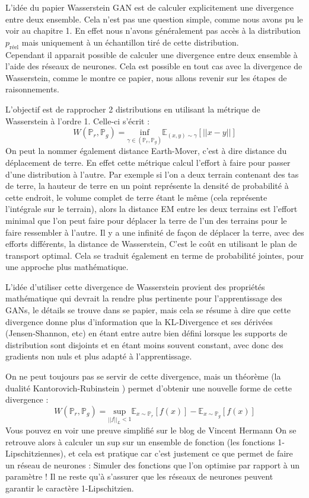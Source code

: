 L'idée du papier Wasserstein GAN est de calculer explicitement une divergence entre deux ensemble. Cela n'est pas une question simple, comme nous avons pu le voir au chapitre 1. En effet nous n'avons généralement pas accès à la distribution $p_{\text{réel}}$ mais uniquement à un échantillon tiré de cette distribution. \\ Cependant il apparait possible de calculer une divergence entre deux ensemble à l'aide des réseaux de neurones. Cela est possible en tout cas avec la divergence de Wasserstein, comme le montre ce papier, nous allons revenir sur les étapes de raisonnements.

L'objectif est de rapprocher 2 distributions en utilisant la métrique de Wasserstein à l'ordre 1. Celle-ci s'écrit :
\[
W(\mathbb{P}_r, \mathbb{P}_g)= \underset{\gamma \in (\mathbb{P}_r, \mathbb{P}_g)}{\text{inf}} \mathbb{E}_{(x,y)\sim\gamma} \left[ ||x-y||\right]
\]
On peut la nommer également distance Earth-Mover, c'est à dire distance du déplacement de terre. En effet cette métrique calcul l'effort à faire pour passer d'une distribution à l'autre. Par exemple si l'on a deux terrain contenant des tas de terre, la hauteur de terre en un point représente la densité de probabilité à cette endroit, le volume complet de terre étant le même (cela représente l'intégrale sur le terrain), alors la distance EM entre les deux terrains est l'effort minimal que l'on peut faire pour déplacer la terre de l'un des terrains pour le faire ressembler à l'autre. Il y a une infinité de façon de déplacer la terre, avec des efforts différents, la distance de Wasserstein, C'est le coût en utilisant le plan de transport optimal. Cela se traduit également en terme de probabilité jointes, pour une approche plus mathématique. 

L'idée d'utiliser cette divergence de Wasserstein provient des propriétés mathématique qui devrait la rendre plus pertinente pour l'apprentissage des GANs, le détails se trouve dans se papier, mais cela se résume à dire que cette divergence donne plus d'information que la KL-Divergence et ses dérivées (Jensen-Shannon, etc) en étant entre autre bien défini lorsque les supports de distribution sont disjoints et en étant moins souvent constant, avec donc des gradients non nuls et plus adapté à l'apprentissage.

On ne peut toujours pas se servir de cette divergence, mais un théorème (la dualité Kantorovich-Rubinstein \cite{optimal-transport}) permet d'obtenir une nouvelle forme de cette divergence :
\[
W(\mathbb{P}_r, \mathbb{P}_g) = \underset{||f||_L<1}{\text{sup}}\mathbb{E}_{x\sim\mathbb{P}_r}\left[f(x)\right] - \mathbb{E}_{x\sim\mathbb{P}_g}\left[f(x)\right]
\]
Vous pouvez en voir une preuve simplifié sur le blog de Vincent Hermann \cite{preuve-wgan}
On se retrouve alors à calculer un sup sur un ensemble de fonction (les fonctions 1-Lipschitziennes), et cela est pratique car c'est justement ce que permet de faire un réseau de neurones : Simuler des fonctions que l'on optimise par rapport à un paramètre ! Il ne reste qu'à s'assurer que les réseaux de neurones peuvent garantir le caractère 1-Lipschitzien.


